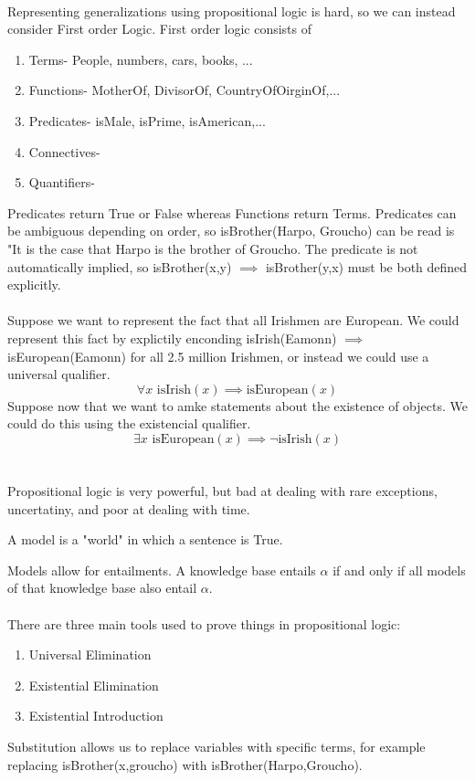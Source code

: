 \documentclass{chezarticle}
\begin{document}
\\
Representing generalizations using propositional logic is hard, so we can instead consider First order Logic. First order logic consists of 
\begin{enumerate}
    \item Terms- People, numbers, cars, books, ...
    \item Functions- MotherOf, DivisorOf, CountryOfOirginOf,...
    \item Predicates- isMale, isPrime, isAmerican,...
    \item Connectives- 
    \item Quantifiers- 
\end{enumerate}
Predicates return True or False whereas Functions return Terms. Predicates can be ambiguous depending on order, so isBrother(Harpo, Groucho) can be read is "It is the case that Harpo is the brother of Groucho. The predicate is not automatically implied, so isBrother(x,y) $\implies$ isBrother(y,x) must be both defined explicitly. \\
\\
Suppose we want to represent the fact that all Irishmen are European. We could represent this fact by explictily enconding isIrish(Eamonn) $\implies$ isEuropean(Eamonn) for all 2.5 million Irishmen, or instead we could use a universal qualifier.
$$\forall x \text{ isIrish}(x) \implies \text{isEuropean}(x)$$
Suppose now that we want to amke statements about the existence of objects. We could do this using the existencial qualifier.
$$\exists x \text{ isEuropean}(x) \implies \neg\text{isIrish}(x)$$
\\
\\
Propositional logic is very powerful, but bad at dealing with rare exceptions, uncertatiny, and poor at dealing with time.
\begin{definition}
A model is a "world" in which a sentence is True.
\end{definition}
Models allow for entailments. A knowledge base entails $\alpha$ if and only if all models of that knowledge base also entail $\alpha$.
\\
\\
There are three main tools used to prove things in propositional logic:
\begin{enumerate}
    \item Universal Elimination
    \item Existential Elimination
    \item Existential Introduction
\end{enumerate}
Substitution allows us to replace variables with specific terms, for example replacing isBrother(x,groucho) with isBrother(Harpo,Groucho).
\end{document}
